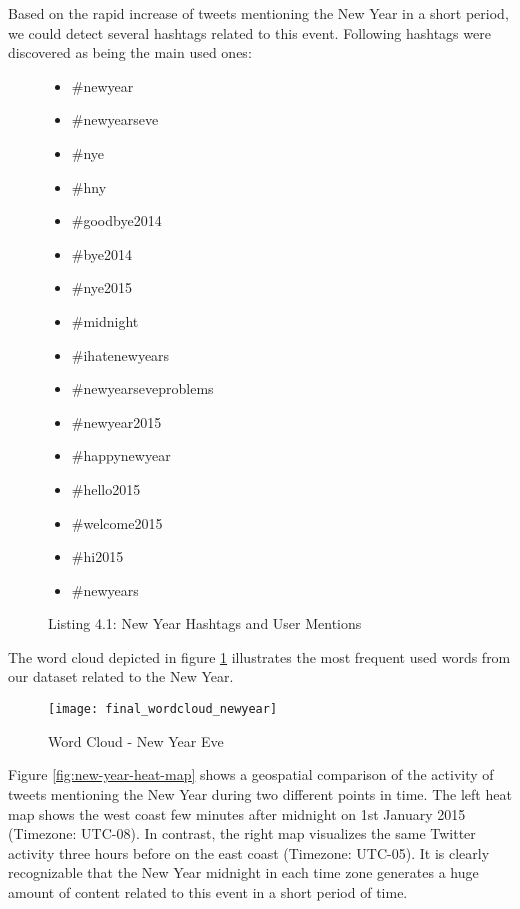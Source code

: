 Based on the rapid increase of tweets mentioning the New Year in a short period, we could detect several hashtags related to this event. Following hashtags were discovered as being the main used ones:

\begin{figure}[H]
\begin{multicols}{3}
  \begin{itemize}[label={}]
  \item \#newyear
  \item \#newyearseve
  \item \#nye
  \item \#hny
  \item \#goodbye2014
  \item \#bye2014
  \item \#nye2015
  \item \#midnight
  \item \#ihatenewyears
  \item \#newyearseveproblems
  \item \#newyear2015
  \item \#happynewyear
  \item \#hello2015
  \item \#welcome2015
  \item \#hi2015
  \item \#newyears
\end{itemize}
\fixspacing
\end{multicols}
\caption*{Listing 4.1: New Year Hashtags and User Mentions}
\end{figure}

The word cloud depicted in figure \ref{fig:new-year-word-cloud} illustrates the most frequent used words from our dataset related to the New Year.

\begin{figure}[H]
  \centering
        \texttt{[image: final\_wordcloud\_newyear]}
  \caption[Word Cloud - New Year Eve]{Word Cloud - New Year Eve}
  \label{fig:new-year-word-cloud}
  \vspace{-1.3em}
\end{figure}

Figure \ref{fig:new-year-heat-map} shows a geospatial comparison of the activity of tweets mentioning the New Year during  two different points in time. The left heat map shows the west coast few minutes after midnight on 1st January 2015 (Timezone: UTC-08). In contrast, the right map visualizes the same Twitter activity three hours before on the east coast (Timezone: UTC-05). It is clearly recognizable that the New Year midnight in each time zone generates a huge amount of content related to this event in a short period of time.

